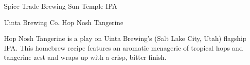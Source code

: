 \begin{recipie}{Spice Trade Brewing Sun Temple IPA}
\begin{ingredientsblock}
\begin{yeasts}
\end{yeasts}

\end{ingredientsblock}

\end{recipie}

\begin{recipie}{Uinta Brewing Co. Hop Nosh Tangerine}

\begin{aboutblock}
Hop Nosh Tangerine is a play on Uinta Brewing’s (Salt Lake City, Utah) flagship IPA. This
homebrew recipe features an aromatic menagerie of tropical hops and tangerine zest and wraps
up with a crisp, bitter finish.
\end{aboutblock}


\begin{methodandtiming}
 
\begin{mashsteps}
\end{mashsteps}

\begin{fermentationsteps}
\end{fermentationsteps}

\end{methodandtiming}

\pagebreak

\begin{ingredientsblock}

\begin{malts}
\end{malts}

\begin{hops}
\end{hops}

\begin{yeasts}
\end{yeasts}

\end{ingredientsblock}

\end{recipie}

